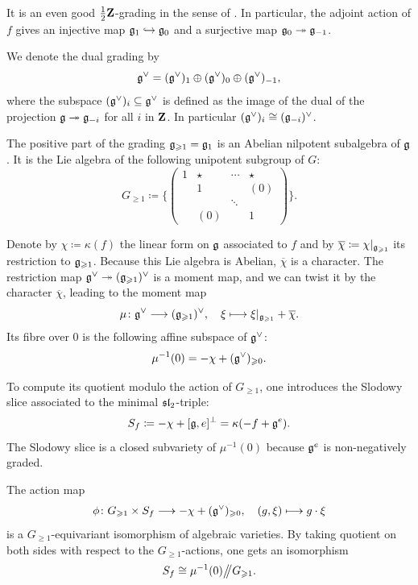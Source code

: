 It is an even good $\frac{1}{2} \Z$-grading in the sense of \cite{elashvili2005classification,brundan2007good}. In particular, the adjoint action of $f$ gives an injective map $\g_1 \hookrightarrow \g_0$ and a surjective map $\g_0 \twoheadrightarrow \g_{-1}$.

We denote the dual grading by
\[ \g^\vee = (\g^\vee)_1 \oplus (\g^\vee)_0 \oplus (\g^\vee)_{-1}, \]
where the subspace $(\g^\vee)_i \subseteq \g^\vee$ is defined as the image of the dual of the projection $\g \twoheadrightarrow \g_{-i}$ for all $i$ in $\Z$. In particular $(\g^\vee)_i \cong (\g_{-i})^\vee$.

The positive part of the grading $\g_{\geqslant 1} = \g_1$ is an Abelian nilpotent subalgebra of $\g$. It is the Lie algebra of the following unipotent subgroup of $G$:
\[ G_{\geqslant 1} \coloneqq \bigg\{\left(\begin{smallmatrix}
	1 & \star & \cdots & \star \\
	& 1 & & (0) \\
	& & \ddots & \\
	&(0)  & & 1
\end{smallmatrix}\right)\bigg\}. \]


Denote by $\chi \coloneq \kappa(f)$ the linear form on $\g$ associated to $f$ and by $\overline{\chi} \coloneqq \chi|_{\g_{\geqslant 1}}$ its restriction to $\g_{\geqslant 1}$. Because this Lie algebra is Abelian, $\overline{\chi}$ is a character. The restriction map $\g^\vee \twoheadrightarrow (\g_{\geqslant 1})^\vee$ is a moment map, and we can twist it by the character $\overline{\chi}$, leading to the moment map
\[ \mu \colon \g^\vee \longrightarrow (\g_{\geqslant 1})^\vee, \quad \xi \longmapsto \xi|_{\g_{\geqslant 1}} + \overline{\chi}. \]
Its fibre over $0$ is the following affine subspace of $\g^\vee$:
\[ \mu^{-1}(0) = - \chi + (\g^\vee)_{\geqslant 0}. \]

To compute its quotient modulo the action of $G_{\geqslant 1}$, one introduces the Slodowy slice associated to the minimal $\sl_2$-triple:
\[ S_f \coloneqq - \chi + [\g, e]^\perp = \kappa(-f + \g^e). \]
The Slodowy slice is a closed subvariety of $ \mu^{-1}(0)$ because $\g^e$ is non-negatively graded.

\begin{theorem} \label{theorem:gan-ginzburg-isomorphism}
	The action map
	\[ \phi \colon G_{\geqslant 1} \times S_f \longrightarrow - \chi + (\g^\vee)_{\geqslant 0}, \quad (g, \xi) \longmapsto g \cdot \xi  \]
	is a $G_{\geqslant 1}$-equivariant isomorphism of algebraic varieties. By taking quotient on both sides with respect to the $G_{\geqslant 1}$-actions, one gets an isomorphism
	\[ S_f \cong \mu^{-1}(0) \git G_{\geqslant 1}. \]
\end{theorem}

